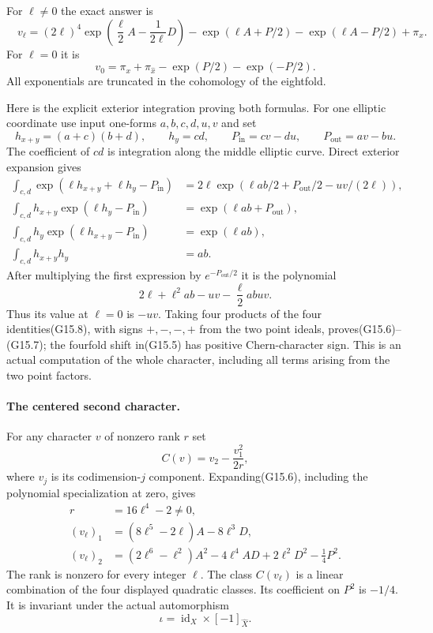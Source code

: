 For $\ell\ne0$ the exact answer is
\[
 \boxed{\quad
 v_\ell=(2\ell)^4
          \exp\left(\frac{\ell}{2}A-\frac{1}{2\ell}D\right)
       -\exp(\ell A+P/2)-\exp(\ell A-P/2)+\pi_x .
       \quad}                                               \tag{G15.6}
\]
For $\ell=0$ it is
\[
           v_0=\pi_x+\pi_{\widehat x}
                         -\exp(P/2)-\exp(-P/2).             \tag{G15.7}
\]
All exponentials are truncated in the cohomology of the
eightfold.

Here is the explicit exterior integration proving both
formulas. For one elliptic coordinate use input one-forms
$a,b,c,d,u,v$ and set
\[
 h_{x+y}=(a+c)(b+d),\qquad h_y=cd,\qquad
 P_{\mathrm{in}}=cv-du,\qquad P_{\mathrm{out}}=av-bu .
\]
The coefficient of $cd$ is integration along the middle
elliptic curve. Direct exterior expansion gives
\[
\begin{aligned}
 \int_{c,d}\exp(\ell h_{x+y}+\ell h_y-P_{\mathrm{in}})
    &=2\ell\exp\left(\ell ab/2+P_{\mathrm{out}}/2
                                     -uv/(2\ell)\right),\\
 \int_{c,d}h_{x+y}\exp(\ell h_y-P_{\mathrm{in}})
    &=\exp(\ell ab+P_{\mathrm{out}}),\\
 \int_{c,d}h_y\exp(\ell h_{x+y}-P_{\mathrm{in}})
    &=\exp(\ell ab),\\
 \int_{c,d}h_{x+y}h_y&=ab .
\end{aligned}                                                \tag{G15.8}
\]
After multiplying the first expression by
$e^{-P_{\mathrm{out}}/2}$ it is the polynomial
\[
             2\ell+\ell^2ab-uv-\frac{\ell}{2}abuv.           \tag{G15.9}
\]
Thus its value at $\ell=0$ is $-uv$. Taking four products
of the four identities(G15.8), with signs $+,-,-,+$
from the two point ideals, proves(G15.6)--(G15.7);
the fourfold shift in(G15.5) has positive Chern-character
sign. This is an actual computation of the whole character,
including all terms arising from the two point factors.

\paragraph{The centered second character.}
For any character $v$ of nonzero rank $r$ set
\[
                    C(v)=v_2-\frac{v_1^2}{2r},              \tag{G15.10}
\]
where $v_j$ is its codimension-$j$ component.
Expanding(G15.6), including the polynomial specialization
at zero, gives
\[
\begin{aligned}
 r&=16\ell^4-2\ne0,\\
 (v_\ell)_1&=(8\ell^5-2\ell)A-8\ell^3D,\\
 (v_\ell)_2&=(2\ell^6-\ell^2)A^2-4\ell^4AD
                       +2\ell^2D^2-\tfrac14P^2.
\end{aligned}                                                \tag{G15.11}
\]
The rank is nonzero for every integer $\ell$.
The class $C(v_\ell)$ is a linear combination of the four
displayed quadratic classes. Its coefficient on $P^2$ is
$-1/4$. It is invariant under the actual automorphism
\[
       \iota=\operatorname{id}_X\times[-1]_{\widehat X}.
\]

